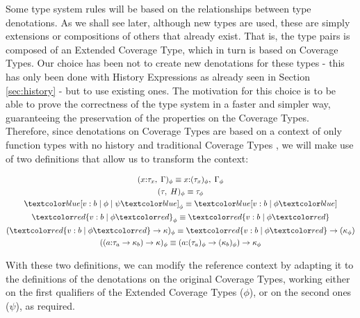 Some type system rules will be based on the relationships between type denotations. As we shall see later, although new types are used, these are simply extensions or compositions of others that already exist. That is, the type pairs is composed of an Extended Coverage Type, which in turn is based on Coverage Types. Our choice has been not to create new denotations for these types - this has only been done with History Expressions as already seen in Section \ref{sec:history} - but to use existing ones. The motivation for this choice is to be able to prove the correctness of the type system in a faster and simpler way, guaranteeing the preservation of the properties on the Coverage Types. Therefore, since denotations on Coverage Types are based on a context of only function types with no history and traditional Coverage Types \cite{coverage}, we will make use of two definitions that allow us to transform the context:

\begin{definition}
    \begin{equation}
        \begin{gathered}
            (x{:}\tau_x, \;\Gamma)_{\phi} \equiv x{:}(\tau_x)_{\phi}, \;\Gamma_{\phi} \\
            (\tau, \;H)_{\phi} \equiv \tau_{\phi} \\
            \under{v: b \;|\; \phi \;|\; \psi}_{\phi} \equiv \under{v: b \;|\; \phi} \\
            \overa{v: b \;|\; \phi}_{\phi} \equiv \overa{v: b \;|\; \phi} \\
            (\overa{v: b \;|\; \phi} \rightarrow \kappa)_{\phi} \equiv \overa{v: b \;|\; \phi} \rightarrow (\kappa_{\phi}) \\
            ((a{:}\tau_a \rightarrow \kappa_b) \rightarrow \kappa)_{\phi} \equiv (a{:}(\tau_a)_{\phi} \rightarrow (\kappa_b)_{\phi}) \rightarrow \kappa_{\phi} \\
        \end{gathered}
    \end{equation}
\end{definition}

With these two definitions, we can modify the reference context by adapting it to the definitions of the denotations on the original Coverage Types, working either on the first qualifiers of the Extended Coverage Types ($\phi$), or on the second ones ($\psi$), as required.

